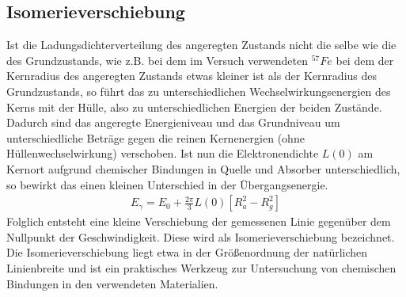 \documentclass[12pt]{article}
\begin{document}
\subsection{Isomerieverschiebung}
Ist die Ladungsdichterverteilung des angeregten Zustands nicht die selbe wie die des Grundzustands, wie z.B. bei dem im Versuch verwendeten $^{57}Fe$ bei dem der Kernradius
des angeregten Zustands etwas kleiner ist als der Kernradius des Grundzustands, so führt das zu unterschiedlichen Wechselwirkungsenergien des Kerns mit
der Hülle, also zu unterschiedlichen Energien der beiden Zustände. Dadurch sind das angeregte Energieniveau und das Grundniveau um unterschiedliche Beträge gegen die
reinen Kernenergien (ohne Hüllenwechselwirkung) verschoben. Ist nun die Elektronendichte $L(0)$ am Kernort aufgrund chemischer Bindungen in Quelle und Absorber unterschiedlich,
so bewirkt das einen kleinen Unterschied in der Übergangsenergie.
\begin{align}
 E_\gamma = E_0 + \frac{2\pi}{3} L(0) \left[ R_a^2 - R_g^2\right]
\end{align}
Folglich entsteht eine kleine Verschiebung der gemessenen Linie gegenüber dem Nullpunkt der Geschwindigkeit. Diese wird als Isomerieverschiebung bezeichnet. Die Isomerieverschiebung
liegt etwa in der Größenordnung der natürlichen Linienbreite und ist ein praktisches Werkzeug zur Untersuchung von chemischen Bindungen in den verwendeten Materialien.
\end{document}
